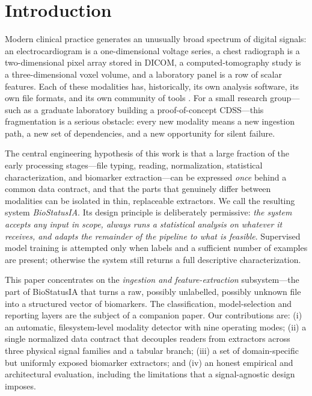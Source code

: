 \documentclass[conference]{IEEEtran}
\begin{document}
\section{Introduction}
Modern clinical practice generates an unusually broad spectrum of digital
signals: an electrocardiogram is a one-dimensional voltage series, a chest
radiograph is a two-dimensional pixel array stored in DICOM, a computed-tomography
study is a three-dimensional voxel volume, and a laboratory panel is a row of
scalar features. Each of these modalities has, historically, its own analysis
software, its own file formats, and its own community of tools
\cite{gramfort2013,mason2011pydicom,brett2020nibabel}. For a small research
group---such as a graduate laboratory building a proof-of-concept CDSS---this
fragmentation is a serious obstacle: every new modality means a new ingestion
path, a new set of dependencies, and a new opportunity for silent failure.

The central engineering hypothesis of this work is that a large fraction of the
early processing stages---file typing, reading, normalization, statistical
characterization, and biomarker extraction---can be expressed \emph{once} behind
a common data contract, and that the parts that genuinely differ between
modalities can be isolated in thin, replaceable extractors. We call the
resulting system \emph{BioStatusIA}. Its design principle is deliberately
permissive: \emph{the system accepts any input in scope, always runs a
statistical analysis on whatever it receives, and adapts the remainder of the
pipeline to what is feasible}. Supervised model training is attempted only when
labels and a sufficient number of examples are present; otherwise the system
still returns a full descriptive characterization.

This paper concentrates on the \emph{ingestion and feature-extraction}
subsystem---the part of BioStatusIA that turns a raw, possibly unlabelled,
possibly unknown file into a structured vector of biomarkers. The
classification, model-selection and reporting layers are the subject of a
companion paper. Our contributions are: (i) an automatic, filesystem-level
modality detector with nine operating modes; (ii) a single normalized data
contract that decouples readers from extractors across three physical signal
families and a tabular branch; (iii) a set of domain-specific but uniformly
exposed biomarker extractors; and (iv) an honest empirical and architectural
evaluation, including the limitations that a signal-agnostic design imposes.
\end{document}
